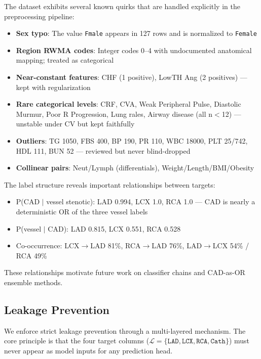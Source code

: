 \documentclass[conference]{IEEEtran}
\begin{document}
The dataset exhibits several known quirks that are handled explicitly in the preprocessing pipeline:

\begin{itemize}
    \item \textbf{Sex typo}: The value \texttt{Fmale} appears in 127 rows and is normalized to \texttt{Female}
    \item \textbf{Region RWMA codes}: Integer codes 0--4 with undocumented anatomical mapping; treated as categorical
    \item \textbf{Near-constant features}: CHF (1 positive), LowTH Ang (2 positives) --- kept with regularization
    \item \textbf{Rare categorical levels}: CRF, CVA, Weak Peripheral Pulse, Diastolic Murmur, Poor R Progression, Lung rales, Airway disease (all n$<$12) --- unstable under CV but kept faithfully
    \item \textbf{Outliers}: TG 1050, FBS 400, BP 190, PR 110, WBC 18000, PLT 25/742, HDL 111, BUN 52 --- reviewed but never blind-dropped
    \item \textbf{Collinear pairs}: Neut/Lymph (differentials), Weight/Length/BMI/Obesity
\end{itemize}

The label structure reveals important relationships between targets:

\begin{itemize}
    \item P(CAD $|$ vessel stenotic): LAD 0.994, LCX 1.0, RCA 1.0 --- CAD is nearly a deterministic OR of the three vessel labels
    \item P(vessel $|$ CAD): LAD 0.815, LCX 0.551, RCA 0.528
    \item Co-occurrence: LCX$\rightarrow$LAD 81\%, RCA$\rightarrow$LAD 76\%, LAD$\rightarrow$LCX 54\% / RCA 49\%
\end{itemize}

These relationships motivate future work on classifier chains and CAD-as-OR ensemble methods.

\subsection{Leakage Prevention}

We enforce strict leakage prevention through a multi-layered mechanism. The core principle is that the four target columns ($\mathcal{L} = \{\texttt{LAD}, \texttt{LCX}, \texttt{RCA}, \texttt{Cath}\}$) must never appear as model inputs for any prediction head.
\end{document}
